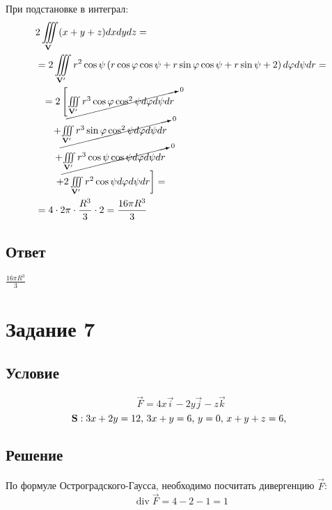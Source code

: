 \documentclass{report}
\newcommand*\task[1]{
       \chapter{#1}
       \section{Условие}
}
\newcommand*\tripleint[2]{\iiint\limits_{#1}#2}
\begin{document}
При подстановке в интеграл:
\begin{align*}
     & 2\tripleint{{\bf{V}}}{(x + y + z)dx dy dz} =                                                                                                          \\
     & = 2\tripleint{{\bf{V^\prime}}}{r^2 \cos \psi \left(r \cos \varphi \cos \psi + r \sin \varphi \cos \psi + r \sin \psi + 2\right)d \varphi d \psi dr} = \\
     & \begin{matrix}
            & = 2\left[ \cancelto{0}{\tripleint{{\bf{V^\prime}}}{r^3 \cos \varphi \cos^2 \psi d \varphi d \psi dr}} \right. \\
            & + \cancelto{0}{\tripleint{{\bf{V^\prime}}}{r^3 \sin \varphi \cos^2 \psi d \varphi d \psi dr}}                 \\
            & + \cancelto{0}{\tripleint{{\bf{V^\prime}}}{r^3 \cos \psi \cos \psi d \varphi d \psi dr}}                      \\
            & \left.+ 2 \tripleint{{\bf{V^\prime}}}{r^2\cos \psi d \varphi d \psi dr} \right] =
       \end{matrix}                                                                            \\
     & =4 \cdot 2\pi \cdot \frac{R^3}{3} \cdot 2 = \frac{16\pi R^3}{3}
\end{align*}

\section{Ответ}

$\frac{16\pi R^3}{3}$

\task{Задание 7}

\begin{equation}
    \label{7:usl}
    \vec{F} = 4x \vec{i} - 2y \vec{j} - z \vec{k}
\end{equation}
\begin{equation}
    \label{7:ogr}
    {\bf{S}}: 3x + 2y = 12 \mbox{, } 3x + y = 6 \mbox{, } y = 0 \mbox{, } x + y + z = 6 \mbox{, }
\end{equation}

\section{Решение}

По формуле Остроградского-Гаусса, необходимо посчитать дивергенцию $\vec{F}$:
$$
    \operatorname{div}\vec{F} = 4 - 2 - 1 = 1
$$
\end{document}

